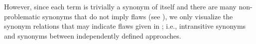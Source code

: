     However, since each term is trivially a synonym of itself and there are many
    non-problematic synonyms that do not imply flaws (see ),
    we only visualize the synonym relations that may indicate flaws given in
    ; i.e., intransitive synonyms and synonyms between
    independently defined approaches.
    \clearpage
    
    \ExampleParChdGraphs{}
    \clearpage
\fi%
